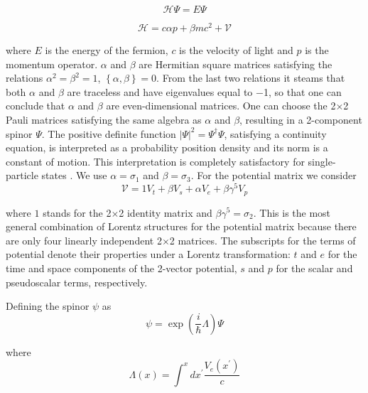 \documentclass[a4paper,12pt,titlepage]{article}
\begin{document}
\begin{equation}
\mathcal{H}\Psi =E\Psi  \label{eq1}
\end{equation}

\begin{equation}
\mathcal{H}=c\alpha p+\beta mc^{2}+\mathcal{V}  \label{eq1a}
\end{equation}

\noindent where $E$ is the energy of the fermion, $c$ is the velocity of
light and $p$ is the momentum operator. $\alpha $ and $\beta $ are Hermitian
square matrices satisfying the relations $\alpha ^{2}=\beta ^{2}=1$, $%
\left\{ \alpha ,\beta \right\} =0$. From the last two relations it steams
that both $\alpha $ and $\beta $ are traceless and have eigenvalues equal to
$-$1, so that one can conclude that $\alpha $ and $\beta $ are
even-dimensional matrices. One can choose the 2$\times $2 Pauli matrices
satisfying the same algebra as $\alpha $ and $\beta $, resulting in a
2-component spinor $\Psi $. The positive definite function $|\Psi |^{2}=\Psi
^{\dagger }\Psi $, satisfying a continuity equation, is interpreted as a
probability position density and its norm is a constant of motion. This
interpretation is completely satisfactory for single-particle states \cite
{tha}. We use $\alpha =\sigma _{1}$ and $\beta =\sigma _{3}$. For the
potential matrix we consider
\begin{equation}
\mathcal{V}=1V_{t}+\beta V_{s}+\alpha V_{e}+\beta \gamma ^{5}V_{p}
\label{eq2}
\end{equation}

\noindent where $1$ stands for the 2$\times $2 identity matrix and $\beta
\gamma ^{5}=\sigma _{2}$. This is the most general combination of Lorentz
structures for the potential matrix because there are only four linearly
independent 2$\times $2 matrices. The subscripts for the terms of potential
denote their properties under a Lorentz transformation: $t$ and $e$ for the
time and space components of the 2-vector potential, $s$ and $p$ for the
scalar and pseudoscalar terms, respectively.

Defining the spinor $\psi $ as
\begin{equation}
\psi =\exp \left( \frac{i}{\hbar }\Lambda \right) \Psi  \label{eq5}
\end{equation}

\noindent where
\begin{equation}
\Lambda (x)=\int^{x}dx^{\prime }\frac{V_{e}(x^{\prime })}{c}  \label{eq6}
\end{equation}
\end{document}
